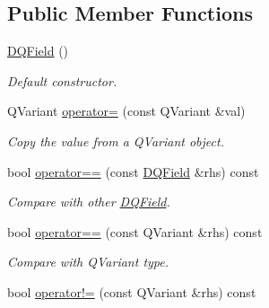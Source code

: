 \subsection*{Public Member Functions}
\begin{DoxyCompactItemize}
\item 
\hypertarget{classDQField_a9aa7cb362ba97731e2e87ab466469562}{
\hyperlink{classDQField_a9aa7cb362ba97731e2e87ab466469562}{DQField} ()}
\label{classDQField_a9aa7cb362ba97731e2e87ab466469562}

\begin{DoxyCompactList}\small\item\em Default constructor. \item\end{DoxyCompactList}\item 
\hypertarget{classDQField_a703a2384ed6c9e52bd7256d1a2f87aec}{
QVariant \hyperlink{classDQField_a703a2384ed6c9e52bd7256d1a2f87aec}{operator=} (const QVariant \&val)}
\label{classDQField_a703a2384ed6c9e52bd7256d1a2f87aec}

\begin{DoxyCompactList}\small\item\em Copy the value from a QVariant object. \item\end{DoxyCompactList}\item 
\hypertarget{classDQField_af97b044232c392fb2798a9c04d4b2c40}{
bool \hyperlink{classDQField_af97b044232c392fb2798a9c04d4b2c40}{operator==} (const \hyperlink{classDQField}{DQField} \&rhs) const }
\label{classDQField_af97b044232c392fb2798a9c04d4b2c40}

\begin{DoxyCompactList}\small\item\em Compare with other \hyperlink{classDQField}{DQField}. \item\end{DoxyCompactList}\item 
\hypertarget{classDQField_acec82d17afefbf25d64f4d46bf404429}{
bool \hyperlink{classDQField_acec82d17afefbf25d64f4d46bf404429}{operator==} (const QVariant \&rhs) const }
\label{classDQField_acec82d17afefbf25d64f4d46bf404429}

\begin{DoxyCompactList}\small\item\em Compare with QVariant type. \item\end{DoxyCompactList}\item 
\hypertarget{classDQField_a08325fc85199eb54268f8753b0e9668b}{
bool \hyperlink{classDQField_a08325fc85199eb54268f8753b0e9668b}{operator!=} (const QVariant \&rhs) const }
\label{classDQField_a08325fc85199eb54268f8753b0e9668b}


\end{DoxyCompactItemize}
